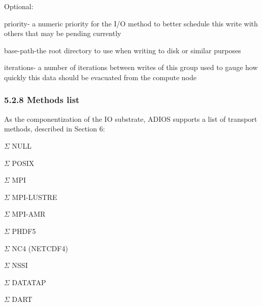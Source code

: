 \vspace{10pt}
\leftskip=0pt
\parindent=0pt
Optional: 

\vspace{10pt}
\leftskip=72pt
\parindent=-50pt
priority- a numeric priority for the I/O method to better schedule this write with 
others that may be pending currently

\vspace{10pt}
\leftskip=85pt
\parindent=-85pt
base-path-the root directory to use when writing to disk or similar purposes

\vspace{10pt}
\parindent=-63pt
iterations- a number of iterations between writes of this group used to gauge how 
quickly this data should be evacuated from the compute node\label{HToc82067524}\label{HToc84890251}\label{HToc212016627}\label{HToc212016869}\label{HToc182553373}

\vspace{10pt}
\subsubsection*{{\large \textbf{5.2.8 Methods list}}}

\vspace{10pt}
\leftskip=0pt
\parindent=0pt
As the componentization of the IO substrate, ADIOS supports a list of transport 
methods, described in Section 6:

\vspace{10pt}
\ensuremath{\Sigma} NULL

\vspace{10pt}
\ensuremath{\Sigma} POSIX

\vspace{10pt}
\ensuremath{\Sigma} MPI

\vspace{10pt}
\ensuremath{\Sigma} MPI-LUSTRE

\vspace{10pt}
\ensuremath{\Sigma} MPI-AMR

\vspace{10pt}
\ensuremath{\Sigma} PHDF5

\vspace{10pt}
\ensuremath{\Sigma} NC4 (NETCDF4)

\vspace{10pt}
\ensuremath{\Sigma} NSSI

\vspace{10pt}
\ensuremath{\Sigma} DATATAP 

\vspace{10pt}
\ensuremath{\Sigma} DART\label{HToc82067525}\label{HToc84890252}\label{HToc212016628}\label{HToc212016870}\label{HRef278900114}\label{HToc182553374}

